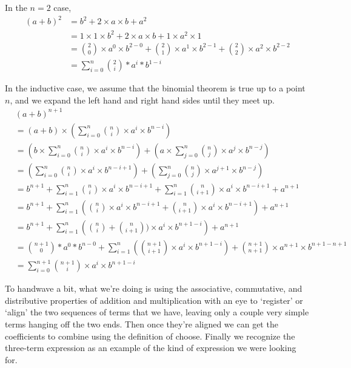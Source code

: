 \documentclass{proc-l}
\theoremstyle{definition}
\theoremstyle{remark}
\numberwithin{equation}{section}
\begin{document}
In the \(n = 2\) case,
\begin{align*}
(a + b)^2 & = b^2 + 2 \times a \times b + a^2 \\ %
& = 1 \times 1 \times b^2 + 2 \times a \times b + 1 \times a^2 \times 1 \\
& = {2 \choose 0} \times a^0 \times b^{2-0} + {2 \choose 1} \times a^1 \times b^{2-1} + {2 \choose 2} \times a^2 \times b^{2-2} \\
& = \sum_{i=0}^n {2 \choose i} * a^i * b^{1-i} %
\end{align*}

In the inductive case, we assume that the binomial theorem is true up to a point \(n\), and we expand the left hand and right hand sides until they meet up.
\begin{align*}
& (a + b)^{n+1} \\ 
& = (a + b) \times (\sum_{i=0}^n {n \choose i} \times a^i \times b^{n-i}) \\ 
& = (b \times \sum_{i=0}^n {n \choose i} \times a^i \times b^{n-i}) + (a \times \sum_{j=0}^n {n \choose j} \times a^j \times b^{n-j}) \\
& = \left(\sum_{i=0}^n {n \choose i} \times a^i \times b^{n-i+1}\right) + \left(\sum_{j=0}^n {n \choose j} \times a^{j+1} \times b^{n-j}\right) \\
& = b^{n+1} + \sum_{i=1}^n {n \choose i} \times a^i \times b^{n-i+1} + \sum_{i=1}^n {n \choose i+1} \times a^i \times b^{n-i+1} + a^{n+1} \\
& = b^{n+1} + \sum_{i=1}^n \left({n \choose i} \times a^i \times b^{n-i+1} + {n \choose i+1} \times a^i \times b^{n-i+1}\right) + a^{n+1} \\
& = b^{n+1} + \sum_{i=1}^n \left({n \choose i} + {n \choose i+1}) \times a^i \times b^{n+1-i}\right) + a^{n+1} \\
& = {n+1 \choose 0} * a^0 * b^{n-0} + \sum_{i=1}^n ({n+1 \choose i+1} \times a^i \times b^{n+1-i}) + {n+1 \choose n+1} \times a^{n+1} \times b^{n+1-n+1} \\
& = \sum_{i=0}^{n+1} {n+1 \choose i} \times a^i \times b^{n+1-i}
\end{align*}

To handwave a bit, what we're doing is using the associative, commutative, and distributive properties of addition and multiplication
with an eye to `register' or `align' the two sequences of terms that we have,
leaving only a couple very simple terms hanging off the two ends.
Then once they're aligned we can get the coefficients to combine using the definition of choose.
Finally we recognize the three-term expression as an example of the kind of expression we were looking for.
\end{document}
